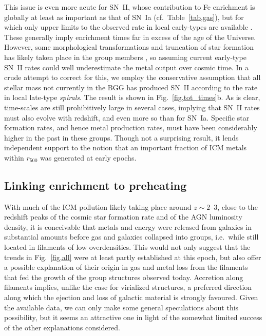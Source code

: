 \documentclass[useAMS,usenatbib]{mn2e}
\begin{document}
This issue is even more acute for SN~II, whose contribution to Fe
enrichment is globally at least as important as that of SN~Ia (cf.\
Table~\ref{tab,gas}), but for which only upper limits to the observed
rate in local early-types are available \citep{mann05}. These
generally imply enrichment times far in excess of the age of the
Universe. However, some morphological transformations and truncation
of star formation has likely taken place in the group members
\citep{hels03}, so assuming current early-type SN~II rates could well
underestimate the metal output over cosmic time. In a crude attempt to
correct for this, we employ the conservative assumption that all
stellar mass not currently in the BGG has produced SN~II according to
the rate in local late-type {\em spirals}. The result is shown in
Fig.~\ref{fig,tot_times}b. As is clear, time-scales are still
prohibitively large in several cases, implying that SN~II rates must
also evolve with redshift, and even more so than for SN~Ia. Specific
star formation rates, and hence metal production rates, must have been
considerably higher in the past in these groups. Though not a
surprising result, it lends independent support to the notion that an
important fraction of ICM metals within $r_{500}$ was generated at
early epochs.




\subsection{Linking enrichment to preheating}

With much of the ICM pollution likely taking place around $z \sim
2$--3, close to the redshift peaks of the cosmic star formation rate
and of the AGN luminosity density, it is conceivable that metals and
energy were released from galaxies in substantial amounts before gas
and galaxies collapsed into groups, i.e.\ while still located in
filaments of low overdensities. This would not only suggest that the
trends in Fig.~\ref{fig,all} were at least partly established at this
epoch, but also offer a possible explanation of their origin in gas
and metal loss from the filaments that fed the growth of the group
structures observed today. Accretion along filaments implies, unlike
the case for virialized structures, a preferred direction along which
the ejection and loss of galactic material is strongly favoured. Given
the available data, we can only make some general speculations about
this possibility, but it seems an attractive one in light of the
somewhat limited success of the other explanations considered.
\end{document}
